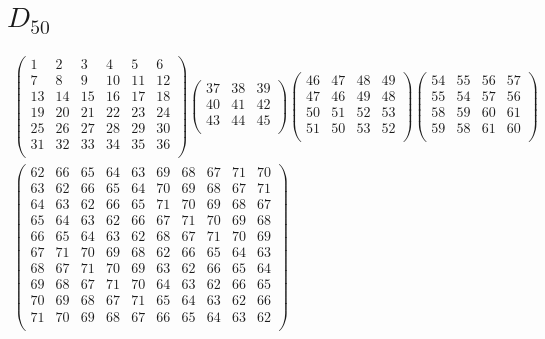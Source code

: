 \documentclass[11pt,a4paper]{amsart}
\begin{document}
\section*{$D_{50}$}
\begin{align*}
\left(\begin{array}{rrrrrr}%
1&2&3&4&5&6\\%
7&8&9&10&11&12\\%
13&14&15&16&17&18\\%
19&20&21&22&23&24\\%
25&26&27&28&29&30\\%
31&32&33&34&35&36\\%
\end{array}\right)%
\left(\begin{array}{rrr}%
37&38&39\\%
40&41&42\\%
43&44&45\\%
\end{array}\right)%
\left(\begin{array}{rrrr}%
46&47&48&49\\%
47&46&49&48\\%
50&51&52&53\\%
51&50&53&52\\%
\end{array}\right)%
\left(\begin{array}{rrrr}%
54&55&56&57\\%
55&54&57&56\\%
58&59&60&61\\%
59&58&61&60\\%
\end{array}\right) \\
\left(\begin{array}{rrrrrrrrrr}%
62&66&65&64&63&69&68&67&71&70\\%
63&62&66&65&64&70&69&68&67&71\\%
64&63&62&66&65&71&70&69&68&67\\%
65&64&63&62&66&67&71&70&69&68\\%
66&65&64&63&62&68&67&71&70&69\\%
67&71&70&69&68&62&66&65&64&63\\%
68&67&71&70&69&63&62&66&65&64\\%
69&68&67&71&70&64&63&62&66&65\\%
70&69&68&67&71&65&64&63&62&66\\%
71&70&69&68&67&66&65&64&63&62\\%
\end{array}\right)%

\end{align*}
\end{document}

